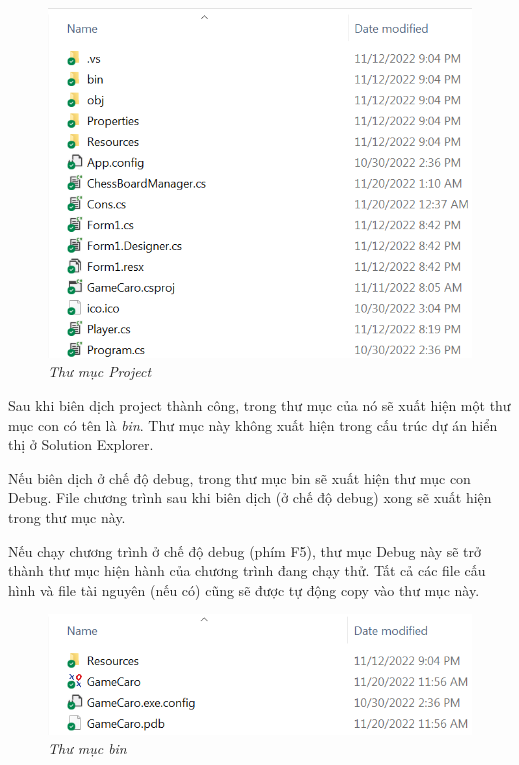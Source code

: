 \begin{figure}[h!]
	\centering
	\includegraphics[scale=.99]{image/dic02.png}
	\caption{\textit{Thư mục Project}} 
\end{figure}

Sau khi biên dịch project thành công, trong thư mục của nó sẽ xuất hiện một thư mục con có tên là \textit{bin}. Thư mục này không xuất hiện trong cấu trúc dự án hiển thị ở Solution Explorer.

Nếu biên dịch ở chế độ debug, trong thư mục bin sẽ xuất hiện thư mục con Debug. File chương trình sau khi biên dịch (ở chế độ debug) xong sẽ xuất hiện trong thư mục này.

Nếu chạy chương trình ở chế độ debug (phím F5), thư mục Debug này sẽ trở thành thư mục hiện hành của chương trình đang chạy thử. Tất cả các file cấu hình và file tài nguyên (nếu có) cũng sẽ được tự động copy vào thư mục này.

\begin{figure}[h!]
	\centering
	\includegraphics[scale=.99]{image/dic03.png}
	\caption{\textit{Thư mục bin}} 
\end{figure}

